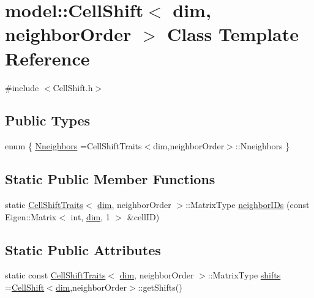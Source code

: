 \hypertarget{classmodel_1_1_cell_shift}{}\section{model\+:\+:Cell\+Shift$<$ dim, neighbor\+Order $>$ Class Template Reference}
\label{classmodel_1_1_cell_shift}


{\ttfamily \#include $<$Cell\+Shift.\+h$>$}

\subsection*{Public Types}
\begin{DoxyCompactItemize}
\item 
enum \{ \hyperlink{classmodel_1_1_cell_shift_ab1590de7ef0bb9642434e2950f5771b2aee4134d6cbf2ecb50b24a8d678fed79f}{Nneighbors} =Cell\+Shift\+Traits$<$dim,neighbor\+Order$>$\+:\+:Nneighbors
 \}
\end{DoxyCompactItemize}
\subsection*{Static Public Member Functions}
\begin{DoxyCompactItemize}
\item 
static \hyperlink{structmodel_1_1_cell_shift_traits}{Cell\+Shift\+Traits}$<$ \hyperlink{plot_nd_a_8m_a382f3ca768b275b8d563604f7fc7df73}{dim}, neighbor\+Order $>$\+::Matrix\+Type \hyperlink{classmodel_1_1_cell_shift_a6903e761b1706d5601dbc643038dec3b}{neighbor\+I\+Ds} (const Eigen\+::\+Matrix$<$ int, \hyperlink{plot_nd_a_8m_a382f3ca768b275b8d563604f7fc7df73}{dim}, 1 $>$ \&cell\+I\+D)
\end{DoxyCompactItemize}
\subsection*{Static Public Attributes}
\begin{DoxyCompactItemize}
\item 
static const \hyperlink{structmodel_1_1_cell_shift_traits}{Cell\+Shift\+Traits}$<$ \hyperlink{plot_nd_a_8m_a382f3ca768b275b8d563604f7fc7df73}{dim}, neighbor\+Order $>$\+::Matrix\+Type \hyperlink{classmodel_1_1_cell_shift_a433e1eeaa68989c6c916af2623c3f2ab}{shifts} =\hyperlink{classmodel_1_1_cell_shift}{Cell\+Shift}$<$\hyperlink{plot_nd_a_8m_a382f3ca768b275b8d563604f7fc7df73}{dim},neighbor\+Order$>$\+::get\+Shifts()
\end{DoxyCompactItemize}
